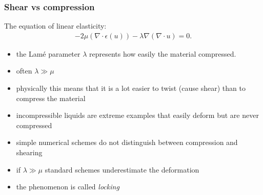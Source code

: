 \begin{frame}
\frametitle{Shear vs compression}
The equation of linear elasticity:
\begin{align}
\label{el:eq}
-2 \mu (\nabla \cdot \epsilon (u)) - \lambda \nabla (\nabla \cdot u) = 0.
\end{align}
\begin{itemize}
\item the  Lam\'{e} parameter $\lambda$ represents how easily the
material compressed.
\item often $\lambda \gg \mu$
\item physically this means that it is a lot easier to twist (cause shear) than to compress the material
\item incompressible liquids are extreme examples that easily deform but are never compressed
\item simple numerical schemes do not distinguish between compression and shearing
\item if $\lambda \gg \mu$ standard schemes underestimate the deformation
\item the phenomenon is called \emph{locking}
\end{itemize}

\end{frame}
